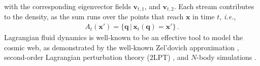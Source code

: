 \documentclass[a4paper, 11pt]{article}
\begin{document}
with the corresponding eigenvector fields $\bm{v}_{t,1}$, and $\bm{v}_{t,2}$. Each stream contributes to the density, as the sum runs over the points that reach $\bm{x}$ in time $t$, \textit{i.e.},
\begin{align}
A_t(\bm{x}') = \{\bm{q}\,|\,\bm{x}_t(\bm{q})=\bm{x}'\}\,.
\end{align} 
Lagrangian fluid dynamics is well-known to be an effective tool to model the cosmic web, as demonstrated by the well-known Zel'dovich approximation \cite{Zeldovich:1970}, second-order Lagrangian perturbation theory ($2$LPT) \cite{Buchert:1992, Buchert:1993a, Buchert:1993b, Buchert:1994a, Buchert:1994b, Bouchet:1995}, and $N$-body simulations \cite{Springel:2005, illustris:2014, eagle:2015, ABACUSSUMMIT:2021, Quijote:2020}. 

\end{document}
